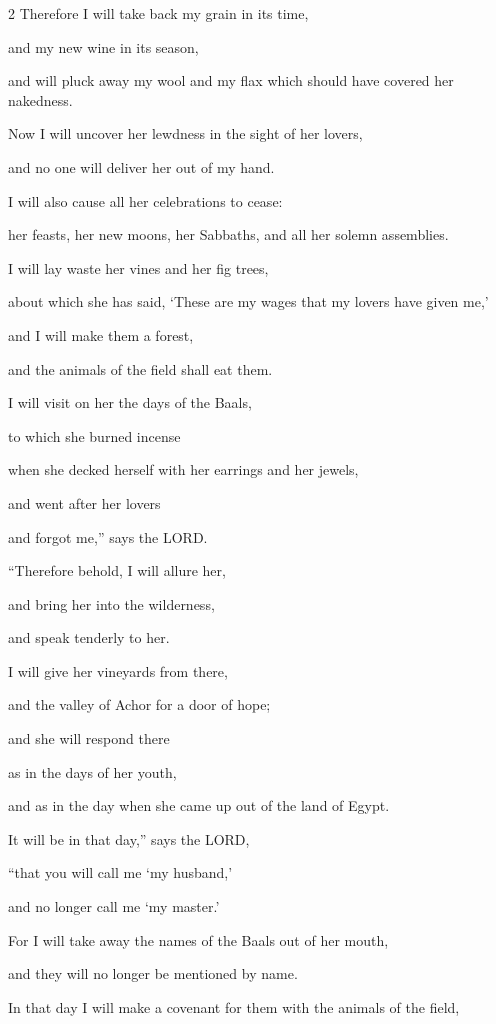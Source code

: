 \begin{multicols}{2}
\myverse{}Therefore I will take back my grain in its time,

and my new wine in its season,

and will pluck away my wool and my flax which should have covered her nakedness.

\myverse{}Now I will uncover her lewdness in the sight of her lovers,

and no one will deliver her out of my hand.

\myverse{}I will also cause all her celebrations to cease:

her feasts, her new moons, her Sabbaths, and all her solemn assemblies.

\myverse{}I will lay waste her vines and her fig trees,

about which she has said, ‘These are my wages that my lovers have given me,’

and I will make them a forest,

and the animals of the field shall eat them.

\myverse{}I will visit on her the days of the Baals,

to which she burned incense

when she decked herself with her earrings and her jewels,

and went after her lovers

and forgot me,” says the LORD.

\myverse{}“Therefore behold, I will allure her,

and bring her into the wilderness,

and speak tenderly to her.

\myverse{}I will give her vineyards from there,

and the valley of Achor for a door of hope;

and she will respond there

as in the days of her youth,

and as in the day when she came up out of the land of Egypt.

\myverse{}It will be in that day,” says the LORD,

“that you will call me ‘my husband,’

and no longer call me ‘my master.’

\myverse{}For I will take away the names of the Baals out of her mouth,

and they will no longer be mentioned by name.

\myverse{}In that day I will make a covenant for them with the animals
of the field,


\end{multicols}
